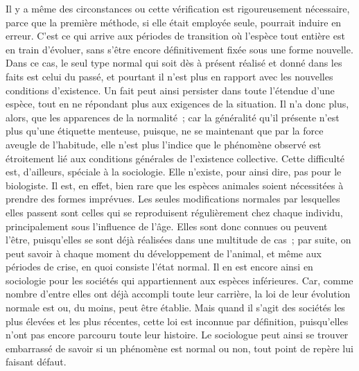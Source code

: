 \documentclass[french,twoside]{book} %
\begin{document}
Il y a même des circonstances ou cette vérification est rigoureusement nécessaire, parce que la première méthode, si elle était employée seule, pourrait induire en erreur. C’est ce qui arrive aux périodes de transition où l’espèce tout entière est en train d’évoluer, sans s’être encore définitivement fixée sous une forme nouvelle. Dans ce cas, le seul type normal qui soit dès à présent réalisé et donné dans les faits est celui du passé, et pourtant il n’est plus en rapport avec les nouvelles conditions d’existence. Un fait peut ainsi persister dans toute l’étendue d’une espèce, tout en ne répondant plus aux exigences de la situation. Il n’a donc plus, alors, que les apparences de la normalité ; car la généralité qu’il présente n’est plus qu’une étiquette menteuse, puisque, ne se maintenant que par la force aveugle de l’habitude, elle n’est plus l’indice que le phénomène observé est étroitement lié aux conditions générales de l’existence collective. Cette difficulté est, d’ailleurs, spéciale à la sociologie. Elle n’existe, pour ainsi dire, pas pour le biologiste. Il est, en effet, bien rare que les espèces animales soient nécessitées à prendre des formes imprévues. Les seules modifications normales par lesquelles elles passent sont celles qui se reproduisent régulièrement chez chaque individu, principalement sous l’influence de l’âge. Elles sont donc connues ou peuvent l’être, puisqu’elles se sont déjà réalisées dans une multitude de cas ; par suite, on peut savoir à chaque moment du développement de l’animal, et même aux périodes de crise, en quoi consiste l’état normal. Il en est encore ainsi en sociologie pour les sociétés qui appartiennent aux espèces inférieures. Car, comme nombre d’entre elles ont déjà accompli toute leur carrière, la loi de leur évolution normale est ou, du moins, peut être établie. Mais quand il s’agit des sociétés les plus élevées et les plus récentes, cette loi est inconnue par définition, puisqu’elles n’ont pas encore parcouru toute leur histoire. Le sociologue peut ainsi se trouver embarrassé de savoir si un phénomène est normal ou non, tout point de repère lui faisant défaut.\par
\end{document}
